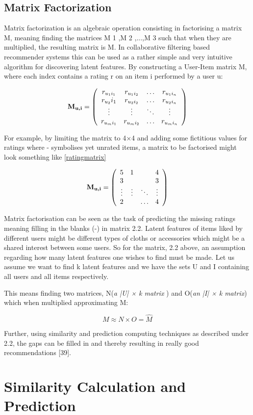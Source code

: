 \subsection{Matrix Factorization}
Matrix factorization is an algebraic operation consisting in factorising a matrix M, meaning finding the matrices M 1 ,M 2 ,...,M 3 such that when they are multiplied, the resulting matrix is M. In collaborative filtering based recommender systems this can be used as a rather simple and very intuitive algorithm for discovering latent features. By constructing a User-Item matrix M, where each index contains a rating r on an item i performed by a user u:

\[  
\label{eq:ratingmatrix}
\textbf{M\textsubscript{u,i}} = \left(
\begin{array}{cccc}
r_{{u_1}{i_1}}&r_{{u_1}{i_2}}& \ldots&r_{{u_1}{i_n}} \\
r_{u_2}{i_1}&r_{{u_2}{i_2}}& \ldots&r_{{u_2}{i_n}} \\
\vdots & \vdots & \ddots & \vdots \\
r_{{u_m}{i_1}}&r_{{u_m}{i_2}}& \ldots&r_{{u_m}{i_n}}
\end{array}
\right)
\]

For example, by limiting the matrix to 4×4 and adding some fictitious values for ratings
where - symbolises yet unrated items, a matrix to be factorised might look something
like \eqref{ratingmatrix}


\[  
\label{eq:numbermatrix}
\textbf{M\textsubscript{u,i}} = \left(
\begin{array}{cccc}
5&1&\-&4 \\
3&\-&\-&3 \\
\vdots & \vdots & \ddots & \vdots \\
2&\-& \ldots&4
\end{array}
\right)
\]

Matrix factorisation can be seen as the task of predicting the missing ratings meaning filling in the blanks (-) in matrix 2.2. Latent features of items liked by different users might be different types of cloths or accessories which might be a shared interest between some users. So for the matrix, 2.2 above, an assumption regarding how many latent features one wishes to find must be made. Let us assume we want to find k latent features and we have the sets U and I containing all users and all items respectively.

This means finding two matrices, N(\textit{a  |U| × k matrix }) and O(\textit{an  |I| × k  matrix}) which when multiplied approximating M:

\[ M \approx N \times O = \hat{M} \]

Further, using similarity and prediction computing techniques as described under 2.2, the gaps can be filled in and thereby resulting in really good recommendations [39].

\section{Similarity Calculation and Prediction }

